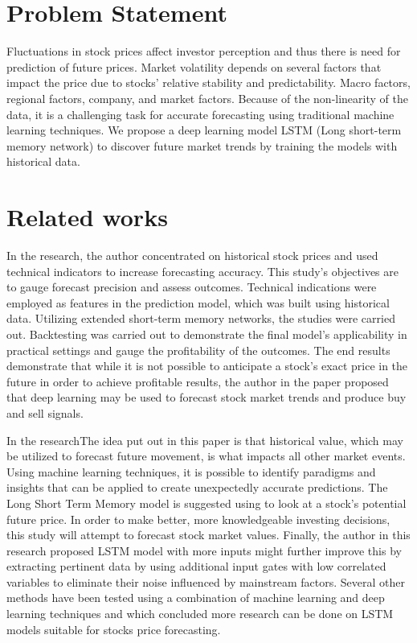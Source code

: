 \section{Problem Statement}
Fluctuations in stock prices affect investor perception and thus there is need for prediction of future prices. Market volatility depends on several factors that impact the price due to stocks' relative stability and predictability. Macro factors, regional factors, company, and market factors. Because of the non-linearity of the data, it is a challenging task for accurate forecasting using traditional machine learning techniques. We propose a deep learning model LSTM (Long short-term memory network) to discover future market trends by training the models with historical data.


\section{Related works}

In the research\cite{technical_indicators_forecasting}, the author concentrated on historical stock prices and used technical indicators to increase forecasting accuracy. This study's objectives are to gauge forecast precision and assess outcomes. Technical indications were employed as features in the prediction model, which was built using historical data. Utilizing extended short-term memory networks, the studies were carried out. Backtesting was carried out to demonstrate the final model's applicability in practical settings and gauge the profitability of the outcomes. The end results demonstrate that while it is not possible to anticipate a stock's exact price in the future in order to achieve profitable results, the author in the paper\cite{technical_indicators_forecasting} proposed that deep learning may be used to forecast stock market trends and produce buy and sell signals.

In the research\cite{forecasting_dl}The idea put out in this paper is that historical value, which may be utilized to forecast future movement, is what impacts all other market events. Using machine learning techniques, it is possible to identify paradigms and insights that can be applied to create unexpectedly accurate predictions. The Long Short Term Memory model is suggested using to look at a stock's potential future price. In order to make better, more knowledgeable investing decisions, this study will attempt to forecast stock market values. Finally, the author in this research proposed LSTM model with more inputs might further improve this by extracting pertinent data by using additional input gates with low correlated variables to eliminate their noise influenced by mainstream factors. Several other methods have been tested using a combination of machine learning and deep learning techniques\cite{forecast_DL_ML} and \cite{forecast_ML} which concluded more research can be done on LSTM models suitable for stocks price forecasting.


